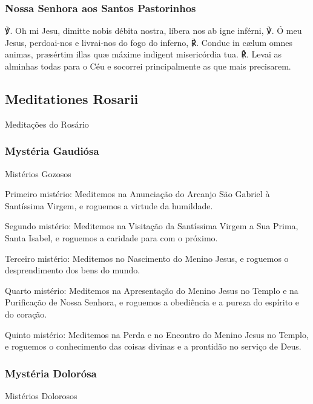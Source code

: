 \subsubsection{Nossa Senhora aos Santos Pastorinhos}

\begin{paracol}{2}
℣. Oh mi Jesu, dimitte nobis débita nostra, líbera nos ab igne inférni,
\switchcolumn
℣. Ó meu Jesus, perdoai-nos e livrai-nos do fogo do inferno,
\switchcolumn*
℟. Conduc in cælum omnes animas, præsértim illas quæ máxime indigent
misericórdia tua.
\switchcolumn
℟. Levai as alminhas todas para o Céu e socorrei principalmente as que mais
precisarem.
\end{paracol}

\subsection{Meditationes Rosarii}
\begin{nscenter}Meditações do Rosário\end{nscenter}
\subsubsection{Mystéria Gaudiósa}
\begin{nscenter}Mistérios Gozosos\end{nscenter}
\begin{nscenter}\emph{}\end{nscenter}

{\redx Primeiro mistério:} Meditemos na Anunciação do Arcanjo São Gabriel à Santíssima Virgem, e roguemos a virtude da humildade.\par
{\redx Segundo mistério:} Meditemos na Visitação da Santíssima Virgem a Sua Prima, Santa Isabel, e roguemos a caridade para com o próximo.\par
{\redx Terceiro mistério:} Meditemos no Nascimento do Menino Jesus, e roguemos o desprendimento dos bens do mundo.\par
{\redx Quarto mistério:} Meditemos na Apresentação do Menino Jesus no Templo e na Purificação de Nossa Senhora, e roguemos a obediência e a pureza do espírito e do coração.\par
{\redx Quinto mistério:} Meditemos na Perda e no Encontro do Menino Jesus no Templo, e roguemos o conhecimento das coisas divinas e a prontidão no serviço de Deus.

\subsubsection{Mystéria Dolorósa}
\begin{nscenter}Mistérios Dolorosos\end{nscenter}
\begin{nscenter}\emph{}\end{nscenter}

